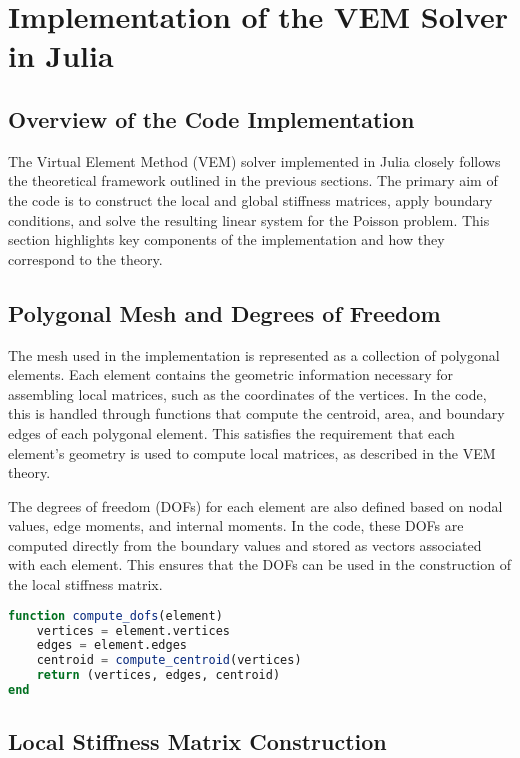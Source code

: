 \documentclass[class=article, crop=false]{standalone}
\begin{document}
\section{Implementation of the VEM Solver in Julia}

\subsection{Overview of the Code Implementation}

The Virtual Element Method (VEM) solver implemented in Julia closely follows the theoretical framework outlined in the previous sections. The primary aim of the code is to construct the local and global stiffness matrices, apply boundary conditions, and solve the resulting linear system for the Poisson problem. This section highlights key components of the implementation and how they correspond to the theory.

\subsection{Polygonal Mesh and Degrees of Freedom}

The mesh used in the implementation is represented as a collection of polygonal elements. Each element contains the geometric information necessary for assembling local matrices, such as the coordinates of the vertices. In the code, this is handled through functions that compute the centroid, area, and boundary edges of each polygonal element. This satisfies the requirement that each element's geometry is used to compute local matrices, as described in the VEM theory.

The degrees of freedom (DOFs) for each element are also defined based on nodal values, edge moments, and internal moments. In the code, these DOFs are computed directly from the boundary values and stored as vectors associated with each element. This ensures that the DOFs can be used in the construction of the local stiffness matrix.

\begin{lstlisting}[language=Julia, caption={Definition of DOFs}]
function compute_dofs(element)
    vertices = element.vertices
    edges = element.edges
    centroid = compute_centroid(vertices)
    return (vertices, edges, centroid)
end
\end{lstlisting}

\subsection{Local Stiffness Matrix Construction}
\end{document}
